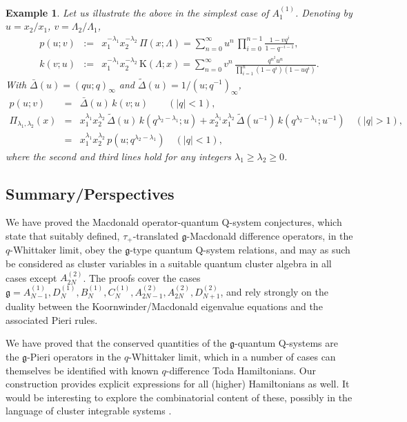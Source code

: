 \documentclass[12pt]{amsart}
\newtheorem{example}[thm]{Example}
\newcommand{\g}{{\mathfrak{g}}}
\newcommand{\lL}{{\Lambda}}
\numberwithin{equation}{section}
\begin{document}
\begin{example}
Let us illustrate the above in the simplest case of $A_1^{(1)}$. Denoting by $u=x_2/x_1$,
$v=\lL_2/\lL_1$,
\begin{eqnarray*}p(u;v)&:=&x_1^{-\lambda_1}x_2^{-\lambda_2}\,\Pi(x;\lL)=\sum_{n=0}^\infty  u^n \,\prod_{i=0}^{n-1} 
\frac{1-v q^i}{1-q^{-i-1}}, \\
k(v;u)&:=&x_1^{-\lambda_1}x_2^{-\lambda_2}\,\mathrm K(\lL;x)=\sum_{n=0}^\infty v^n\,
\frac{q^{n^2} u^n}{\prod_{i=1}^{n}(1-q^i)(1- u q^i)} .\end{eqnarray*}
With $\bar \Delta(u)=(q u;q)_{\infty}$ and $\tilde \Delta(u)=1/(u;q^{-1})_{\infty}$, 
\begin{eqnarray*}
p(u;v)&=& \bar \Delta(u)\, k(v;u) \qquad (|q|<1),\\
\Pi_{\lambda_1,\lambda_2}(x)&=& x_1^{\lambda_1}x_2^{\lambda_2}\, \tilde \Delta(u)\,  k(q^{\lambda_2-\lambda_1};u)+ 
x_2^{\lambda_1}x_1^{\lambda_2}\,\tilde \Delta(u^{-1})\,  k(q^{\lambda_2-\lambda_1};u^{-1})\quad (|q|>1),\\
&=& x_1^{\lambda_1}x_2^{\lambda_2}\,p(u;q^{\lambda_2-\lambda_1})\quad (|q|<1),
\end{eqnarray*}
where the second and third lines hold for any integers $\lambda_1\geq \lambda_2\geq 0$.
\end{example}

\subsection{Summary/Perspectives}\label{sec:summary}

We have proved the Macdonald operator-quantum Q-sys\-tem conjectures, which state that suitably defined,
$\tau_+$-translated $\g$-Macdonald difference operators, in the $q$-Whittaker limit, obey the $\g$-type quantum Q-system 
relations, and may as such be considered as cluster variables in a suitable quantum cluster algebra in all cases except $A_{2N}^{(2)}$.
The proofs cover the cases $\g=A_{N-1}^{(1)},D_N^{(1)},B_N^{(1)}, C_N^{(1)}, A_{2N-1}^{(2)},A_{2N}^{(2)},D_{N+1}^{(2)}$, and rely strongly on the duality between the Koornwinder/Macdonald eigenvalue equations and the associated Pieri rules. 

We have proved that the conserved quantities of the $\g$-quantum Q-systems are the $\g$-Pieri operators in the $q$-Whittaker limit,
which in a number of cases can themselves be identified with known $q$-difference Toda Hamiltonians. Our construction provides explicit expressions for all (higher) Hamiltonians as well. It would be interesting to explore the combinatorial content of these, possibly in the language of cluster integrable systems
\cite{GoncharovKenyon}. 
\end{document}
